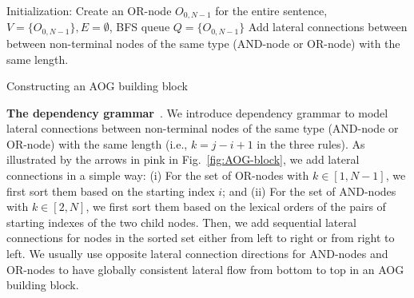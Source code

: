 \documentclass[10pt,twocolumn,letterpaper]{article}
\begin{document}

\begin{algorithm} %
\SetAlgoLined
{}
Initialization: Create an OR-node $O_{0,N-1}$ for the entire sentence, $V=\{O_{0,N-1}\}, E=\emptyset$, BFS queue $Q=\{O_{0,N-1}\}$\;
Add lateral connections between between non-terminal nodes of the same type (AND-node or OR-node) with the same length.  
\caption{Constructing an AOG building block}\label{alg:AOG} 
\end{algorithm}

\textbf{The dependency grammar}~\cite{DependencyGrammar,RCN,Zhu_Grammar}. We introduce dependency grammar to model lateral connections between non-terminal nodes of the same type (AND-node or OR-node) with the same length (i.e., $k=j-i+1$ in the three rules). As illustrated by the arrows in pink in Fig.~\ref{fig:AOG-block}, we add lateral connections in a simple way: (i) For the set of OR-nodes with $k\in [1, N-1]$, we first sort them based on the starting index $i$; and (ii) For the set of AND-nodes with $k\in [2, N]$, we first sort them based on the lexical orders of the pairs of starting indexes of the two child nodes. Then, we add sequential lateral connections for nodes in the sorted set either from left to right or from right to left. We usually use opposite lateral connection directions for AND-nodes and OR-nodes to have globally consistent lateral flow from bottom to top in an AOG building block.  
\end{document}
